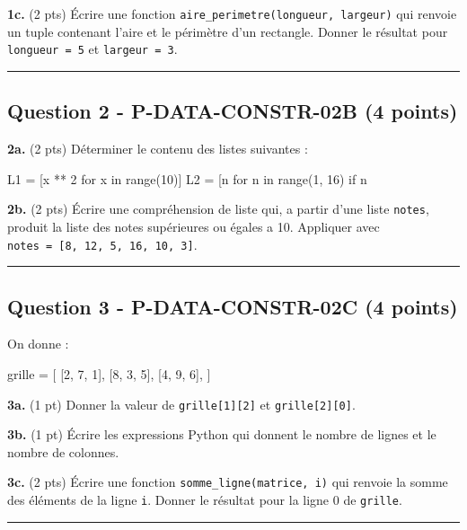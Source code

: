 \textbf{1c.} (2 pts) Écrire une fonction
\texttt{aire\_perimetre(longueur,\ largeur)} qui renvoie un tuple
contenant l'aire et le périmètre d'un rectangle. Donner le résultat pour
\texttt{longueur\ =\ 5} et \texttt{largeur\ =\ 3}.

\begin{center}\rule{0.5\linewidth}{0.5pt}\end{center}

\subsection{Question 2 - P-DATA-CONSTR-02B (4 points)}

\textbf{2a.} (2 pts) Déterminer le contenu des listes suivantes :

\begin{python}
L1 = [x ** 2 for x in range(10)]
L2 = [n for n in range(1, 16) if n %
\end{python}

\textbf{2b.} (2 pts) Écrire une compréhension de liste qui, a partir
d'une liste \texttt{notes}, produit la liste des notes supérieures ou
égales a 10. Appliquer avec
\texttt{notes\ =\ {[}8,\ 12,\ 5,\ 16,\ 10,\ 3{]}}.

\begin{center}\rule{0.5\linewidth}{0.5pt}\end{center}

\subsection{Question 3 - P-DATA-CONSTR-02C (4 points)}

On donne :

\begin{python}
grille = [
    [2, 7, 1],
    [8, 3, 5],
    [4, 9, 6],
]
\end{python}

\textbf{3a.} (1 pt) Donner la valeur de \texttt{grille{[}1{]}{[}2{]}} et
\texttt{grille{[}2{]}{[}0{]}}.

\textbf{3b.} (1 pt) Écrire les expressions Python qui donnent le nombre
de lignes et le nombre de colonnes.

\textbf{3c.} (2 pts) Écrire une fonction
\texttt{somme\_ligne(matrice,\ i)} qui renvoie la somme des éléments de
la ligne \texttt{i}. Donner le résultat pour la ligne 0 de
\texttt{grille}.

\begin{center}\rule{0.5\linewidth}{0.5pt}\end{center}


